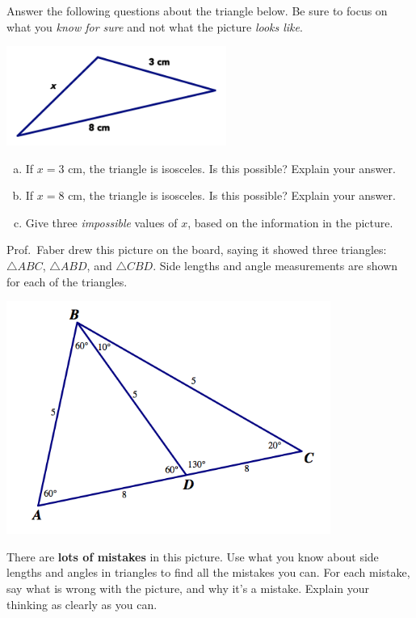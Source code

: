 \begin{problem}
Answer the following questions about the triangle below.  Be sure to focus on what you \emph{know for sure} and not what the picture \emph{looks like}.

\begin{center}
\includegraphics[height=3.25cm]{triineq1}
\end{center}


\begin{enumerate}[(a)]
\item
If $x=3$ cm, the triangle is isosceles.  Is this possible? Explain your answer. \\

\item
If $x=8$ cm, the triangle is isosceles.  Is this possible? Explain your answer. \\

\item
Give three \emph{impossible} values of $x$, based on the information in the picture.\\
\end{enumerate}

\end{problem}

\bigskip


\begin{problem}
Prof.~Faber drew this picture on the board, saying it showed three triangles: $\triangle ABC$, $\triangle ABD$, and $\triangle CBD$.  Side lengths and angle measurements are shown for each of the triangles.

\begin{center}
\includegraphics[height=3in]{badtris}
\end{center}

\noindent
There are {\bf lots of mistakes} in this picture.  Use what you know about side lengths and angles in triangles to find all the mistakes you can.  For each mistake, say what is wrong with the picture, and why it's a mistake.  Explain your thinking as clearly as you can.  

\end{problem}

